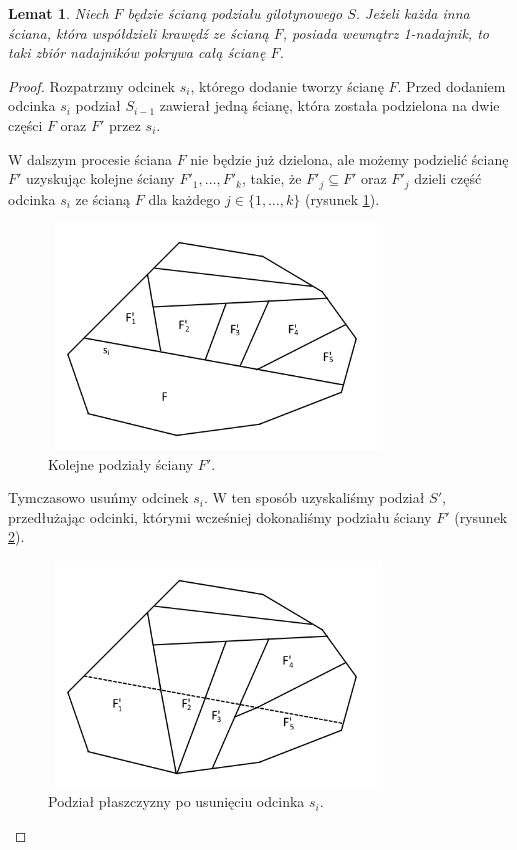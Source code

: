 \documentclass[brudnopis]{xmgr}
\newtheorem{Lemat}{Lemat}
\theoremstyle{definition}
\begin{document}
\begin{Lemat}\label{sasiednie sciany strzega F} \cite{knadajniki}
  Niech $F$ będzie ścianą podziału gilotynowego $S$. Jeżeli każda inna ściana, która współdzieli krawędź ze ścianą $F$, posiada wewnątrz 1-nadajnik, to taki zbiór nadajników pokrywa całą ścianę $F$.
\end{Lemat}
\begin{proof}
\indent Rozpatrzmy odcinek $s_i$, którego dodanie tworzy ścianę $F$. Przed dodaniem odcinka $s_i$ podział $S_{i-1}$ zawierał jedną ścianę, która została podzielona na dwie części $F$ oraz $F'$ przez $s_i$. 

W dalszym procesie ściana $F$ nie będzie już dzielona, ale możemy podzielić ścianę $F'$ uzyskując kolejne ściany $F'_1, \ldots, F'_k$, takie, że $F'_j \subseteq F'$ oraz $F'_j$ dzieli część odcinka $s_i$ ze ścianą $F$ dla każdego $j \in \{1,\ldots,k\}$ (rysunek \ref{fig:podzial F' na kolejne ściany}).

\begin{figure}[ht!]
  \centering
  \includegraphics[width=9cm,height=6cm]{rysunki/podzial_F'.png}
  \caption{Kolejne podziały ściany $F'$.}
  \label{fig:podzial F' na kolejne ściany}
\end{figure} 
Tymczasowo usuńmy odcinek $s_i$. W ten sposób uzyskaliśmy podział $S'$, przedłużając odcinki, którymi wcześniej dokonaliśmy podziału ściany $F'$ (rysunek \ref{fig:podzial po usunieciu si}).

\begin{figure}[ht!]
  \centering
  \includegraphics[width=9cm,height=6cm]{rysunki/usuniete_si.png}
  \caption{Podział płaszczyzny po usunięciu odcinka $s_i$.}
  \label{fig:podzial po usunieciu si}
\end{figure} 


\end{proof}
\end{document}

